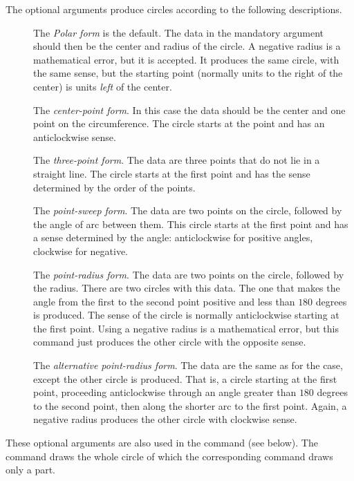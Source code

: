 \documentclass[letterpaper]{article}
\begin{document}
The optional arguments produce circles according to the following
descriptions.
%
\begin{description}
\item[] The \textit{Polar form} is the default. The data in the
mandatory argument should then be the center  and radius
 of the circle. A negative radius is a mathematical error, but
it is accepted. It produces the same circle, with the same sense, but
the starting point (normally  units to the right of the
center) is  units \emph{left} of the center.

\item[] The \textit{center-point form}. In this case the data
should be the center and one point on the circumference. The circle
starts at the point and has an anticlockwise sense.

\item[] The \textit{three-point form}. The data are three points
that do not lie in a straight line. The circle starts at the first point
and has the sense determined by the order of the points.

\item[] The \textit{point-sweep form}. The data are two points on the
circle, followed by the angle of arc between them. This circle starts at
the first point and has a sense determined by the angle: anticlockwise
for positive angles, clockwise for negative.

\item[] The \textit{point-radius form}. The data are two points on the
circle, followed by the radius. There are two circles with this data.
The one that makes the angle from the first to the second point positive
and less than $180$ degrees is produced. The sense of the circle is
normally anticlockwise starting at the first point. Using a negative
radius is a mathematical error, but this command just produces the other
circle with the opposite sense.

\item[] The \textit{alternative point-radius form}. The data are
the same as for the  case, except the other circle is produced.
That is, a circle starting at the first point, proceeding anticlockwise
through an angle greater than $180$ degrees to the second point, then
along the shorter arc to the first point. Again, a negative radius
produces the other circle with clockwise sense.
\end{description}
%
These optional arguments are also used in the  command (see
below). The  command draws the whole circle of which the
corresponding  command draws only a part.
\end{document}
